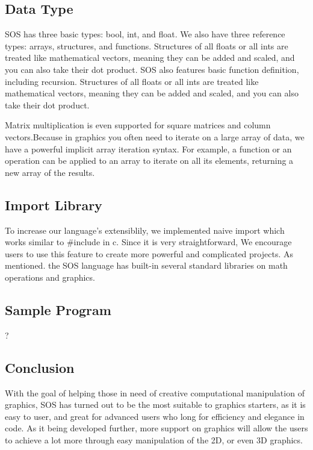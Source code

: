 \documentclass[main.tex]{subfiles}
\begin{document}
	\subsection{Data Type}
	SOS has three basic types: bool, int, and float. We also have three reference types: arrays, structures, and functions.
	Structures of all floats or all ints are treated like mathematical vectors, meaning they can be added and scaled, and you can also take their dot product. 
    SOS also features basic function definition, including recursion.
    Structures of all floats or all ints are treated like mathematical vectors, meaning they can be added and scaled, and you can also take their dot product. 
    
    Matrix multiplication is even supported for square matrices and column vectors.Because in graphics you often need to iterate on a large array of data, we have a powerful implicit array iteration syntax. For example, a function or an operation can be applied to an array to iterate on all its elements, returning a new array of the results.

    \subsection{Import Library}
     To increase our language’s extensiblily, we implemented naive import which works similar to #include in c. Since it is very straightforward, We encourage users to use this feature to create more powerful and complicated projects. As mentioned. the SOS language has built-in several standard libraries on math operations and graphics. 
     
    \subsection{Sample Program}
    ?

    \subsection{Conclusion}
    With the goal of helping those in need of creative computational manipulation of graphics, SOS has turned out to be the most suitable to graphics starters, as it is easy to user, and great for advanced users who long for efficiency and elegance in code. As it being developed further, more support on graphics will allow the users to achieve a lot more through easy manipulation of the 2D, or even 3D graphics.

	
\end{document}
